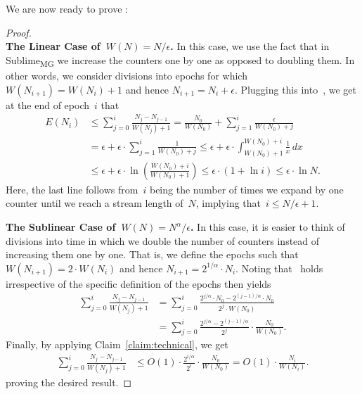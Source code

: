 \documentclass[sigconf]{acmart}
\newcommand{\sketch}{Sublime}
\newcommand{\sketchmg}{\sketch\textsubscript{MG}\xspace}
\newcommand{\parentheses}[1]{\left(#1\right)}
\begin{document}
\noindent
We are now ready to prove :
\thmmgnormal*
\begin{proof} ‌\\
    \textbf{The Linear Case of~$W(N)=N/\epsilon$.} 
    In this case, we use the fact that in \sketchmg we increase the counters
    one by one as opposed to doubling them. In other words, we consider
    divisions into epochs for which~$W(N_{i+1})=W(N_i)+1$ and hence
    $N_{i+1}=N_i+\epsilon$. Plugging this into~, we get
    at the end of epoch~$i$ that 
	\begin{align*}
		E(N_i)&\leq \sum_{j=0}^i  \frac{N_j - N_{j-1}}{W(N_j)+1} = \frac{N_0}{W(N_0)} + \sum_{j=1}^i  \frac{\epsilon}{W(N_0)+j} \\
		&= \epsilon + \epsilon \cdot \sum_{j=1}^i  \frac{1}{W(N_0)+j} \leq \epsilon + \epsilon \cdot \int_{W(N_0)+1}^{W(N_0)+i} \frac{1}{x} \,dx\\
		& \leq \epsilon + \epsilon \cdot \ln\parentheses{\frac{W(N_0)+i}{W(N_0)+1}} \leq \epsilon \cdot (1+\ln i) \leq \epsilon \cdot \ln N.
	\end{align*}
    Here, the last line follows from~$i$ being the number of times we expand by
    one counter until we reach a stream length of~$N$, implying that~$i \leq
    N/\epsilon+1$. 

    \medskip\noindent
    \textbf{The Sublinear Case of~$W(N)=N^{\alpha}/\epsilon$.}
    In this case, it is easier to think of divisions into time in which we
    double the number of counters instead of increasing them one by one. That
    is, we define the epochs such that~$W(N_{i+1}) = 2\cdot W(N_i)$ and hence
    $N_{i+1} = 2^{1/\alpha} \cdot N_i$. Noting that~ holds
    irrespective of the specific definition of the epochs then yields
    \begin{align*}
        \sum_{j=0}^i \frac{N_j - N_{j-1}}{W(N_j)+1} & = \sum_{j=0}^i \frac{2^{j/\alpha} \cdot N_0 - 2^{(j-1)/\alpha} \cdot N_0} {2^j \cdot W(N_0)} \\
        & = \sum_{j=0}^i  \frac{2^{j/\alpha}- 2^{(j-1)/\alpha}} {2^j} \cdot \frac{N_0}{W(N_0)}.
    \end{align*}
    Finally, by applying Claim~\ref{claim:technical}, we get
    \begin{align*}
        \sum_{j=0}^i \frac{N_j - N_{j-1}}{W(N_j)+1} & \leq  O(1) \cdot \frac{2^{i/\alpha}}{2^i} \cdot \frac{N_0}{W(N_0)} = O(1) \cdot \frac{N_i}{W(N_i)}.
    \end{align*}
    proving the desired result.
\end{proof}
\end{document}
